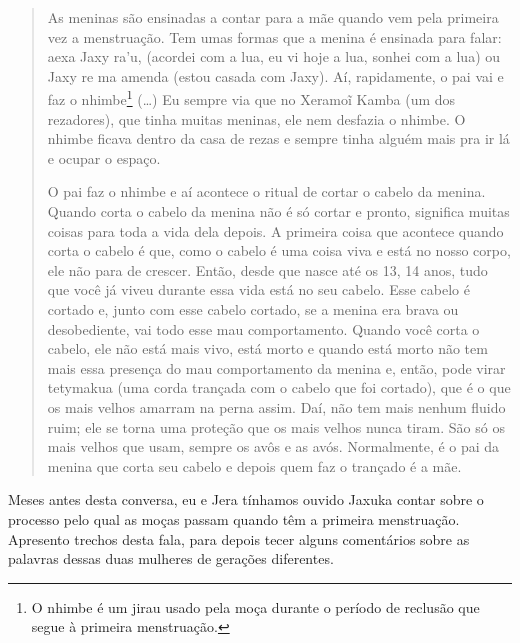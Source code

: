 \begin{quotation}
\noindent
As meninas são ensinadas a contar para a mãe quando vem pela primeira
vez a menstruação. Tem umas formas que a menina é ensinada para falar:
aexa Jaxy ra’u, (acordei com a lua, eu vi hoje a lua, sonhei com a lua)
ou Jaxy re ma amenda (estou casada com Jaxy). Aí, rapidamente, o pai
vai e faz o nhimbe\footnote{O nhimbe é um jirau usado pela moça durante
o período de reclusão que segue à primeira menstruação.} (\ldots{}) Eu
sempre via que no Xeramoĩ Kamba (um dos rezadores), que tinha muitas
meninas, ele nem desfazia o nhimbe. O nhimbe ficava dentro da casa de
rezas e sempre tinha alguém mais pra ir lá e ocupar o espaço. 

\noindent
O pai faz o nhimbe e aí acontece o ritual de cortar o cabelo da menina.
Quando corta o cabelo da menina não é só cortar e pronto, significa
muitas coisas para toda a vida dela depois. A primeira coisa que
acontece quando corta o cabelo é que, como o cabelo é uma coisa viva e
está no nosso corpo, ele não para de crescer. Então, desde que nasce
até os 13, 14 anos, tudo que você já viveu durante essa vida está no
seu cabelo. Esse cabelo é cortado e, junto com esse cabelo cortado, se
a menina era brava ou desobediente, vai todo esse mau comportamento.
Quando você corta o cabelo, ele não está mais vivo, está morto e quando
está morto não tem mais essa presença do mau comportamento da menina e,
então, pode virar tetymakua (uma corda trançada com o cabelo que foi
cortado), que é o que os mais velhos amarram na perna assim. Daí, não
tem mais nenhum fluido ruim; ele se torna uma proteção que os mais
velhos nunca tiram. São só os mais velhos que usam, sempre os avôs e as
avós. Normalmente, é o pai da menina que corta seu cabelo e depois quem
faz o trançado é a mãe. 

\end{quotation}
Meses antes desta conversa, eu e Jera tínhamos ouvido Jaxuka contar
sobre o processo pelo qual as moças passam quando têm a primeira
menstruação. Apresento trechos desta fala, para depois tecer alguns
comentários sobre as palavras dessas duas mulheres de gerações
diferentes. 

\bigskip

